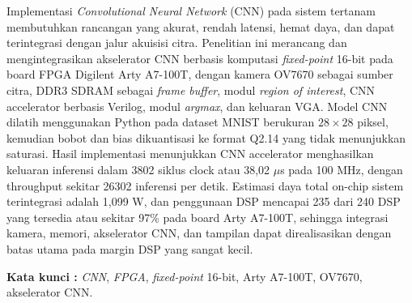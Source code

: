 Implementasi \emph{Convolutional Neural Network} (CNN) pada sistem tertanam membutuhkan rancangan yang akurat, rendah latensi, hemat daya, dan dapat terintegrasi dengan jalur akuisisi citra. Penelitian ini merancang dan mengintegrasikan akselerator CNN berbasis komputasi \emph{fixed-point} 16-bit pada board FPGA Digilent Arty A7-100T, dengan kamera OV7670 sebagai sumber citra, DDR3 SDRAM sebagai \emph{frame buffer}, modul \emph{region of interest}, CNN accelerator berbasis Verilog, modul \emph{argmax}, dan keluaran VGA. Model CNN dilatih menggunakan Python pada dataset MNIST berukuran $28 \times 28$ piksel, kemudian bobot dan bias dikuantisasi ke format Q2.14 yang tidak menunjukkan saturasi. Hasil implementasi menunjukkan CNN accelerator menghasilkan keluaran inferensi dalam 3802 siklus clock atau 38,02 $\mu$s pada 100 MHz, dengan throughput sekitar 26302 inferensi per detik. Estimasi daya total on-chip sistem terintegrasi adalah 1,099 W, dan penggunaan DSP mencapai 235 dari 240 DSP yang tersedia atau sekitar 97\% pada board Arty A7-100T, sehingga integrasi kamera, memori, akselerator CNN, dan tampilan dapat direalisasikan dengan batas utama pada margin DSP yang sangat kecil.

\bigskip
\noindent
\textbf{Kata kunci :} \emph{CNN}, \emph{FPGA}, \emph{fixed-point} 16-bit, Arty A7-100T, OV7670, akselerator CNN.